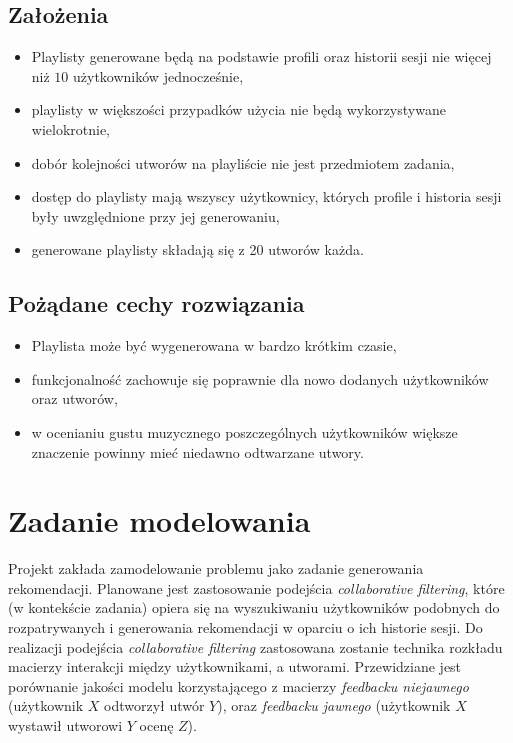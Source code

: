\documentclass[10pt,a4paper]{article}
\begin{document}
\subsection{Założenia}
\begin{itemize}
	\item Playlisty generowane będą na podstawie profili oraz historii sesji nie więcej niż $10$ użytkowników jednocześnie,
	\item playlisty w większości przypadków użycia nie będą wykorzystywane wielokrotnie,
	\item dobór kolejności utworów na playliście nie jest przedmiotem zadania,
	\item dostęp do playlisty mają wszyscy użytkownicy, których profile i historia sesji były uwzględnione przy jej generowaniu,
	\item generowane playlisty składają się z 20 utworów każda.
\end{itemize}

\subsection{Pożądane cechy rozwiązania}
\begin{itemize}

\item Playlista może być wygenerowana w bardzo krótkim czasie,

\item funkcjonalność zachowuje się poprawnie dla nowo dodanych użytkowników oraz utworów,

\item w ocenianiu gustu muzycznego poszczególnych użytkowników większe znaczenie powinny mieć niedawno odtwarzane utwory.

\end{itemize}

\section{Zadanie modelowania}
	
Projekt zakłada zamodelowanie problemu jako zadanie generowania rekomendacji. Planowane jest zastosowanie podejścia \textit{collaborative filtering}, które (w kontekście zadania) opiera się na wyszukiwaniu użytkowników podobnych do rozpatrywanych i generowania rekomendacji w oparciu o ich historie sesji. Do realizacji podejścia \textit{collaborative filtering} zastosowana zostanie technika rozkładu macierzy interakcji między użytkownikami, a utworami. Przewidziane jest porównanie jakości modelu korzystającego z macierzy \textit{feedbacku niejawnego} (użytkownik $X$ odtworzył utwór $Y$), oraz \textit{feedbacku jawnego} (użytkownik $X$ wystawił utworowi $Y$ ocenę $Z$).
\end{document}
